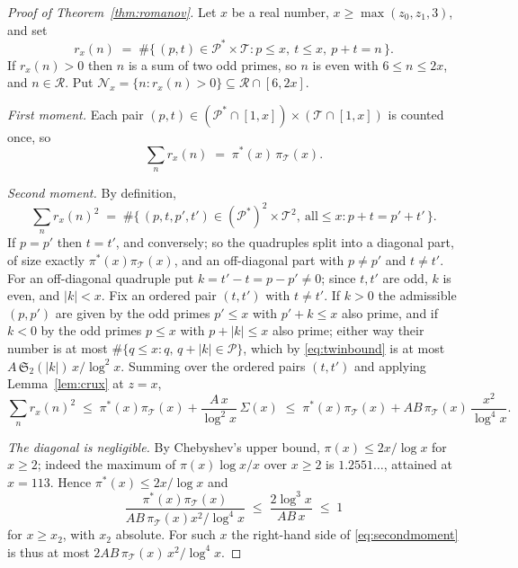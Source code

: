\documentclass[10pt]{article}
\theoremstyle{definition}
\theoremstyle{remark}
\newcommand{\T}{\mathcal{T}}
\newcommand{\PP}{\mathcal{P}}
\begin{document}
\begin{proof}[Proof of Theorem~\ref{thm:romanov}]
Let $x$ be a real number, $x \ge \max(z_0, z_1, 3)$, and set
\[
  r_x(n) \;=\; \#\{\, (p,t) \in \PP^{*}\times\T :
    p \le x,\ t \le x,\ p + t = n \,\}.
\]
If $r_x(n) > 0$ then $n$ is a sum of two odd primes, so $n$ is even with
$6 \le n \le 2x$, and $n \in \mathcal{R}$. Put
$\mathcal{N}_x = \{n : r_x(n) > 0\} \subseteq \mathcal{R}\cap[6,2x]$.

\emph{First moment.} Each pair $(p,t) \in (\PP^{*}\cap[1,x]) \times
(\T\cap[1,x])$ is counted once, so
\begin{equation}\label{eq:firstmoment}
  \sum_{n} r_x(n) \;=\; \pi^{*}(x)\,\pi_\T(x).
\end{equation}

\emph{Second moment.} By definition,
\[
  \sum_n r_x(n)^{2} \;=\;
  \#\{\, (p,t,p',t') \in (\PP^{*})^{2}\times\T^{2},\ \text{all} \le x :
    p + t = p' + t' \,\}.
\]
If $p = p'$ then $t = t'$, and conversely; so the quadruples split into a
diagonal part, of size exactly $\pi^{*}(x)\pi_\T(x)$, and an off-diagonal part
with $p \ne p'$ and $t \ne t'$. For an off-diagonal quadruple put
$k = t' - t = p - p' \ne 0$; since $t,t'$ are odd, $k$ is even, and $|k| < x$.
Fix an ordered pair $(t,t')$ with $t \ne t'$. If $k > 0$ the admissible
$(p,p')$ are given by the odd primes $p' \le x$ with $p'+k \le x$ also prime,
and if $k < 0$ by the odd primes $p \le x$ with $p + |k| \le x$ also prime;
either way their number is at most
$\#\{q \le x : q,\, q+|k| \in \PP\}$, which by \eqref{eq:twinbound} is at most
$A\,\mathfrak{S}_2(|k|)\,x/\log^{2}x$. Summing over the ordered pairs $(t,t')$
and applying Lemma~\ref{lem:crux} at $z = x$,
\begin{equation}\label{eq:secondmoment}
  \sum_n r_x(n)^{2}
  \;\le\; \pi^{*}(x)\pi_\T(x)
    + \frac{A\,x}{\log^{2}x}\,\Sigma(x)
  \;\le\; \pi^{*}(x)\pi_\T(x)
    + AB\,\pi_\T(x)\,\frac{x^{2}}{\log^{4}x}.
\end{equation}

\emph{The diagonal is negligible.} By Chebyshev's upper bound,
$\pi(x) \le 2x/\log x$ for $x \ge 2$; indeed the maximum of
$\pi(x)\log x / x$ over $x \ge 2$ is $1.2551\ldots$, attained at $x = 113$.
Hence $\pi^{*}(x) \le 2x/\log x$ and
\[
  \frac{\pi^{*}(x)\pi_\T(x)}{AB\,\pi_\T(x)x^{2}/\log^{4}x}
  \;\le\; \frac{2\log^{3}x}{AB\,x} \;\le\; 1
\]
for $x \ge x_2$, with $x_2$ absolute. For such $x$ the right-hand side
of \eqref{eq:secondmoment} is thus at most
$2AB\,\pi_\T(x)\,x^{2}/\log^{4}x$.


\end{proof}
\end{document}
